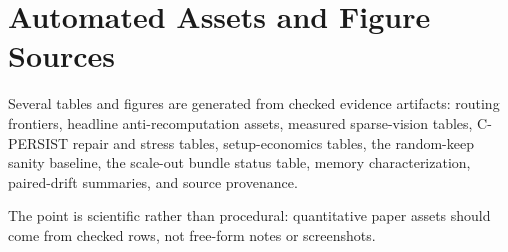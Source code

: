 \section{Automated Assets and Figure Sources}

Several tables and figures are generated from checked evidence artifacts:
routing frontiers, headline anti-recomputation assets, measured sparse-vision
tables, C-PERSIST repair and stress tables, setup-economics tables, the
random-keep sanity baseline, the scale-out bundle status table, memory
characterization, paired-drift summaries, and source provenance.

The point is scientific rather than procedural: quantitative paper assets
should come from checked rows, not free-form notes or screenshots.
